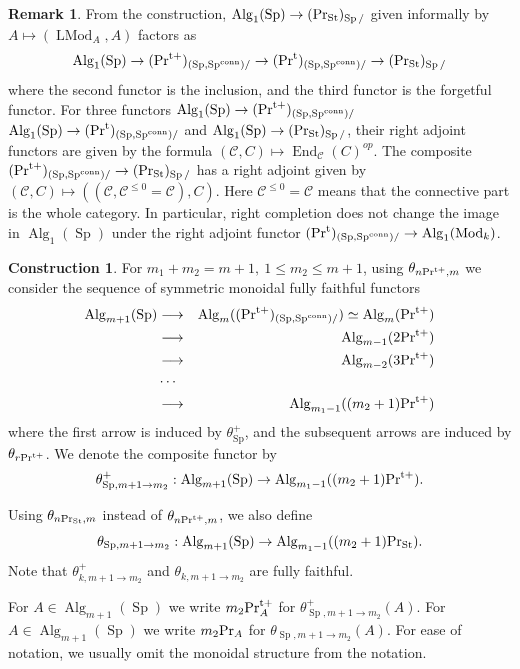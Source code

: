 \documentclass[leqno,12pt]{amsart}
\theoremstyle{plain}
\theoremstyle{definition}
\newtheorem{Remark}[Theorem]{Remark}
\newtheorem{Construction}[Theorem]{Construction}
\newcommand{\CCC}{\mathcal{C}}
\newcommand{\PR}{\textup{Pr}}
\newcommand{\PRT}{\textup{Pr}^{\textup{t}}}
\newcommand{\PRTT}{\textup{Pr}^{\textup{t}+}}
\newcommand{\SP}{\operatorname{Sp}}
\newcommand{\SPC}{\operatorname{Sp}^{\textup{conn}}}
\newcommand{\Mod}{\operatorname{Mod}}
\newcommand{\Alg}{\operatorname{Alg}}
\newcommand{\End}{\operatorname{End}}
\newcommand{\PRST}{\PR_{\textup{St}}}
\newcommand{\LMod}{\operatorname{LMod}}
\begin{document}
\begin{Remark}
\label{tmodulerem}
From the construction,
$\Alg_1(\SP)\to (\PRST)_{\SP/}$
given informally by $A\mapsto (\LMod_A,A)$
factors as
\[
\Alg_{1}(\SP)\to  (\PRTT)_{(\SP,\SPC)/} \to (\PRT)_{(\SP,\SPC)/}\to  (\PRST)_{\SP/}
\]
where the second functor is the inclusion, and the third functor is the forgetful functor.
For three functors $\Alg_{1}(\SP)\to  (\PRTT)_{(\SP,\SPC)/} $ $\Alg_{1}(\SP) \to (\PRT)_{(\SP,\SPC)/}$ and $\Alg_{1}(\SP)\to  (\PRST)_{\SP/}$,
their right adjoint functors are given by the formula
$(\CCC,C)\mapsto \End_{\CCC}(C)^{op}$.
The composite $(\PRTT)_{(\SP,\SPC)/} \to  (\PRST)_{\SP/}$ has a right adjoint given by $(\CCC,C)\mapsto ((\CCC,\CCC^{\le0}=\CCC),C)$.
Here $\CCC^{\le0}=\CCC$ means that the connective part is the whole category.
In particular, right completion does not change the image in $\Alg_1(\SP)$ under the right adjoint functor  $ (\PRT)_{(\SP,\SPC)/}\to \Alg_1(\Mod_k)$.
\end{Remark}







\begin{Construction}
\label{thetaconst1}
For $m_1+m_2=m+1,\ 1\le m_2\le m+1$, using $\theta_{n\PRTT,m}$ we consider the sequence of symmetric monoidal fully faithful functors
\begin{eqnarray*}
\Alg_{m+1}(\SP)  &\longrightarrow&  \Alg_{m}((\PRTT)_{(\SP,\SPC)/})\simeq \Alg_{m}(\PRTT) \\
 &\longrightarrow&  \Alg_{m-1}(2\PRTT) \\
&\longrightarrow&  \Alg_{m-2}(3\PRTT) \\
&\cdots& \\
&\longrightarrow&   \Alg_{m_1-1}((m_2+1)\PRTT)
\end{eqnarray*}
where the first arrow is induced by $\theta_{\SP}^+$, and the subsequent arrows are induced by $\theta_{r\PRTT}$.
We denote the composite functor by 
\[
\theta_{\SP,m+1\to m_2}^+:\Alg_{m+1}(\SP)\to \Alg_{m_1-1}((m_2+1)\PRTT).
\]

Using $\theta_{n\PRST,m}$ instead of $\theta_{n\PRTT,m}$,
we also define 
\[
\theta_{\SP,m+1\to m_2}:\Alg_{m+1}(\SP)\to \Alg_{m_1-1}((m_2+1)\PRST).
\]
Note that $\theta_{k,m+1\to m_2}^+$ and $\theta_{k,m+1\to m_2}$
 are fully faithful.


For  $A\in \Alg_{m+1}(\SP)$ we write $m_2\PRTT_A$ for $\theta_{\SP,m+1\to m_2}^+(A)$.
For  $A\in \Alg_{m+1}(\SP)$ we write $m_2\PR_A$ for $\theta_{\SP,m+1\to m_2}(A)$.
For ease of notation,
we usually omit the monoidal structure from the notation.
\end{Construction}
\end{document}
